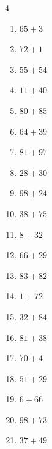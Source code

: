 \begin{multicols}{4}
\begin{enumerate}
  \item $65+3$
        \phantom{$=68$}

  \item $72+1$
        \phantom{$=73$}

  \item $55+54$
        \phantom{$=109$}

  \item $11+40$
        \phantom{$=51$}

  \item $80+85$
        \phantom{$=165$}

  \item $64+39$
        \phantom{$=103$}

  \item $81+97$
        \phantom{$=178$}

  \item $28+30$
        \phantom{$=58$}

  \item $98+24$
        \phantom{$=122$}

  \item $38+75$
        \phantom{$=113$}

  \item $8+32$
        \phantom{$=40$}

\columnbreak %

  \item $66+29$
        \phantom{$=95$}

  \item $83+82$
        \phantom{$=165$}

  \item $1+72$
        \phantom{$=73$}

  \item $32+84$
        \phantom{$=116$}

  \item $81+38$
        \phantom{$=119$}

  \item $70+4$
        \phantom{$=74$}

  \item $51+29$
        \phantom{$=80$}

  \item $6+66$
        \phantom{$=72$}

  \item $98+73$
        \phantom{$=171$}

  \item $37+49$
        \phantom{$=86$}


\end{enumerate}
\end{multicols}
